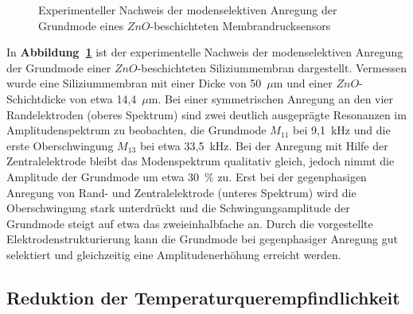 \begin{figure}[htb]

\vspace*{14cm}
%

\caption{\label{abbmemselekmess}
 Experimenteller Nachweis der modenselektiven Anregung der Grundmode eines
 $ZnO$-beschichteten Membrandrucksensors}
\end{figure}
In {\bf Abbildung~\ref{abbmemselekmess}} ist der experimentelle Nachweis
der modenselektiven Anregung der Grundmode einer $ZnO$-beschichteten
Siliziummembran dargestellt. Vermessen wurde eine Siliziummembran mit einer
Dicke von 50~$\mu$m und einer $ZnO$-Schichtdicke von etwa 14,4~$\mu$m.
Bei einer symmetrischen Anregung an den vier Randelektroden
(oberes Spektrum) sind zwei deutlich ausgeprägte Resonanzen im
Amplitudenspektrum zu beobachten, die Grundmode $M_{11}$ bei 9,1~kHz
und die erste Oberschwingung $M_{13}$ bei etwa 33,5~kHz. Bei der Anregung
mit Hilfe der Zentralelektrode bleibt das Modenspektrum qualitativ gleich,
jedoch nimmt die Amplitude der Grundmode um etwa 30~\% zu.
Erst bei der gegenphasigen Anregung von Rand- und Zentralelektrode
(unteres Spektrum) wird die Oberschwingung stark unterdrückt und die
Schwingungsamplitude der Grundmode steigt auf etwa das zweieinhalbfache an.
Durch die vorgestellte Elektrodenstrukturierung kann die Grundmode bei
gegenphasiger Anregung gut selektiert und gleichzeitig eine
Amplitudenerhöhung erreicht werden.


\subsection{Reduktion der Temperaturquerempfindlichkeit}
\label{temperaturquerempfindlichkeit}


